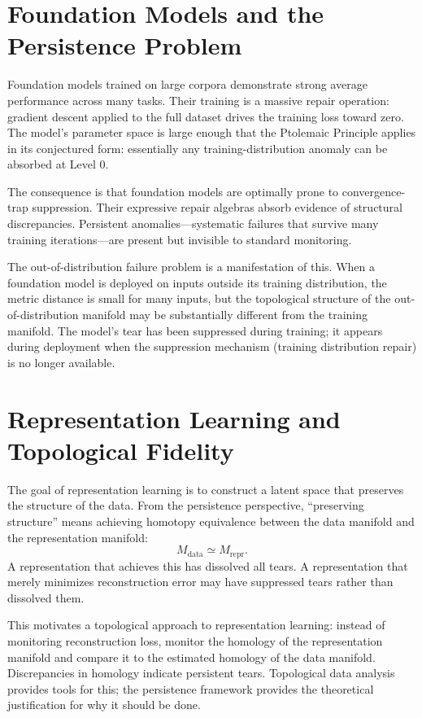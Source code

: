 \documentclass[12pt,oneside]{book}
\theoremstyle{plain}
\theoremstyle{definition}
\theoremstyle{remark}
\newcommand{\1}{\mathbf{1}}
\begin{document}
\section{Foundation Models and the Persistence Problem}

Foundation models trained on large corpora demonstrate strong average performance across many tasks. Their training is a massive repair operation: gradient descent applied to the full dataset drives the training loss toward zero. The model's parameter space is large enough that the Ptolemaic Principle applies in its conjectured form: essentially any training-distribution anomaly can be absorbed at Level 0.

The consequence is that foundation models are optimally prone to convergence-trap suppression. Their expressive repair algebras absorb evidence of structural discrepancies. Persistent anomalies---systematic failures that survive many training iterations---are present but invisible to standard monitoring.

The out-of-distribution failure problem is a manifestation of this. When a foundation model is deployed on inputs outside its training distribution, the metric distance is small for many inputs, but the topological structure of the out-of-distribution manifold may be substantially different from the training manifold. The model's tear has been suppressed during training; it appears during deployment when the suppression mechanism (training distribution repair) is no longer available.

\section{Representation Learning and Topological Fidelity}

The goal of representation learning is to construct a latent space that preserves the structure of the data. From the persistence perspective, ``preserving structure'' means achieving homotopy equivalence between the data manifold and the representation manifold:
\[
M_{\mathrm{data}} \simeq M_{\mathrm{repr}}.
\]
A representation that achieves this has dissolved all tears. A representation that merely minimizes reconstruction error may have suppressed tears rather than dissolved them.

This motivates a topological approach to representation learning: instead of monitoring reconstruction loss, monitor the homology of the representation manifold and compare it to the estimated homology of the data manifold. Discrepancies in homology indicate persistent tears. Topological data analysis provides tools for this; the persistence framework provides the theoretical justification for why it should be done.
\end{document}
